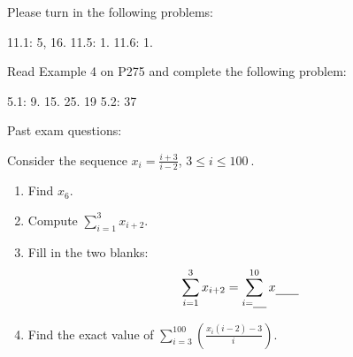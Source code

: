 \documentclass[12pt,twoside]{article}
\newcommand{\blank}[1]{\underline{\hspace{#1}}}
\newcommand{\dsst}{\displaystyle}
\begin{document}
Please turn in the following problems: 

11.1: 5, 16.
11.5: 1.
11.6: 1.

Read Example 4 on P275 and complete the following problem:

5.1: 9. 15. 25. 19
5.2: 37

Past exam questions: 

Consider the sequence $x_i = \dsst\frac{i+3}{i-2}$, $3\leq i \leq 100\
$.

\begin{enumerate}
  \item Find $x_6$.

  \item Compute $\dsst\sum_{i=1}^3 x_{i+2}$.

  \item Fill in the two blanks: $$\dsst\sum_{i=1}^3 x_{i+2} = \dsst\sum_{i=\blank{0.15in}}^{10} x_{\blank{0.25in}}$$

  \item Find the exact value of $\dsst\sum_{i=3}^{100} \left(\frac{x_i(i-2)-3}{i\
}\right)$.

\end{enumerate}
\end{document}
